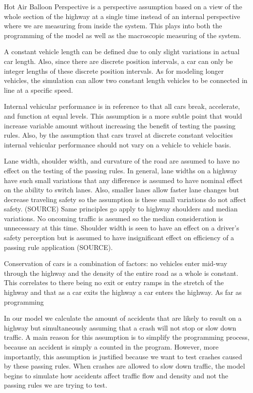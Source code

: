 \documentclass{amsart}
\begin{document}
		Hot Air Balloon Perspective is a perspective assumption based on a view of the whole section of the highway at a single time instead of an internal perspective where we are measuring from inside the system.  This plays into both the programming of the model as well as the macroscopic measuring of the system. 
		
		A constant vehicle length can be defined due to only slight variations in actual car length. Also, since there are discrete position intervals, a car can only be integer lengths of these discrete position intervals. As for modeling longer vehicles, the simulation can allow two constant length vehicles to be connected in line at a specific speed.

		Internal vehicular performance is in reference to that all cars break, accelerate, and function at equal levels.  This assumption is a more subtle point that would increase variable amount without increasing the benefit of testing the passing rules.  Also, by the assumption that cars travel at discrete constant velocities internal vehicular performance should not vary on a vehicle to vehicle basis.   

		Lane width, shoulder width, and curvature of the road are assumed to have no effect on the testing of the passing rules.  In general, lane widths on a highway have such small variations that any difference is assumed to have nominal effect on the ability to switch lanes.  Also, smaller lanes allow faster lane changes but decrease traveling safety so the assumption is these small variations do not affect safety.  (SOURCE) Same principles go apply to highway shoulders and median variations. No oncoming traffic is assumed so the median consideration is unnecessary at this time.  Shoulder width is seen to have an effect on a driver's safety perception but is assumed to have insignificant effect on efficiency of a passing rule application (SOURCE).

		Conservation of cars is a combination of factors: no vehicles enter mid-way through the highway and the density of the entire road as a whole is constant.  This correlates to there being no exit or entry ramps in the stretch of the highway and that as a car exits the highway a car enters the highway.  As far as programming  

		In our model we calculate the amount of accidents that are likely to result on a highway but simultaneously assuming that a crash will not stop or slow down traffic.  A main reason for this assumption is to simplify the programming process, because an accident is simply a counted in the program. However, more importantly, this assumption is justified because we want to test crashes caused by these passing rules.  When crashes are allowed to slow down traffic, the model begins to simulate how accidents affect traffic flow and density and not the passing rules we are trying to test.  
\end{document}
